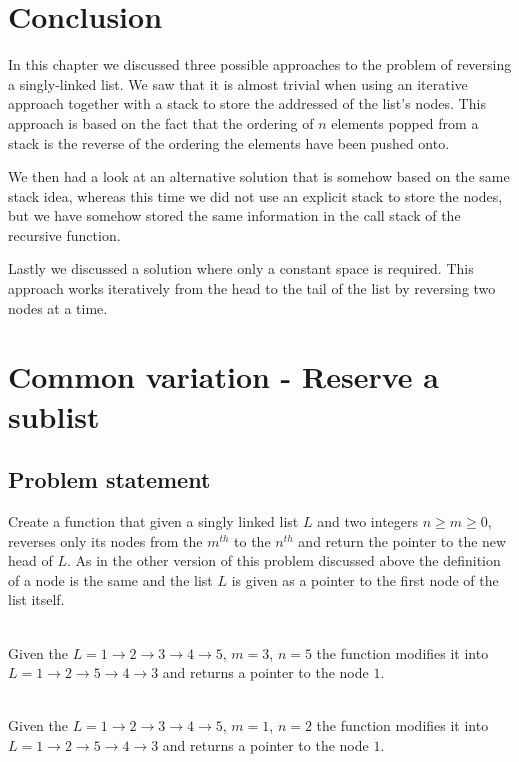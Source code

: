 \section{Conclusion}
In this chapter we discussed three possible approaches to the problem of reversing a singly-linked list.
We saw that it is almost trivial when using an iterative approach together with a stack to store the addressed of the list's nodes. 
This approach is based on the fact that the ordering of $n$  elements popped from a stack is the reverse of the ordering the elements have been pushed onto.

We then had a look at an alternative solution that is somehow based on the same stack idea, whereas this time we did not use an explicit stack to store the nodes, but we have somehow stored the same information in the 
call stack of the recursive function. 

Lastly we discussed a solution where only a constant space is required. This approach works iteratively from the head to the tail of the list by reversing two nodes at a time.

\section{Common variation - Reserve a sublist}
\subsection{Problem statement}
\begin{exercise}
Create a function that given a singly linked list $L$ and two integers $n \geq  m \geq 0$,
reverses only its nodes from the $m^{th}$ to the $n^{th}$ and return the pointer to the new
head of $L$. As in the other version of this problem discussed above the definition of a node is the same and the list 
$L$ is given as a pointer to the first node of the list itself.

\begin{example}
	\hfill \\
	Given the $L = 1 \rightarrow 2 \rightarrow 3 \rightarrow 4 \rightarrow 5$, $m = 3$, $n = 5$ the function modifies
	it into $L = 1 \rightarrow 2 \rightarrow 5 \rightarrow 4 \rightarrow 3$ and returns a pointer to
	the node $1$.
\end{example}

\begin{example}
	\hfill \\
	Given the $L = 1 \rightarrow 2 \rightarrow 3 \rightarrow 4 \rightarrow 5$, $m = 1$, $n = 2$ the function modifies
	it into $L = 1 \rightarrow 2 \rightarrow 5 \rightarrow 4 \rightarrow 3$ and returns a pointer to
	the node $1$.
\end{example}

\end{exercise}

